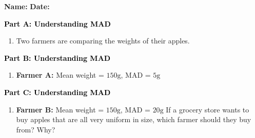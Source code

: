 \documentclass[12pt, letterpaper, fleqn]{article}
\begin{document}
\textbf{Name:} \underline{\hspace{5cm}}
\hfill
\textbf{Date:} \underline{\hspace{3cm}}\\

\begin{tcolorbox}[colback=customteal!20]
\large\textcolor{black}{\textbf{Part A: Understanding MAD}}
\end{tcolorbox}

\vspace{3mm}

\begin{enumerate}[itemsep=4.2cm, leftmargin=0.6cm]
\item Two farmers are comparing the weights of their apples. 
\end{enumerate}

\newpage

\begin{tcolorbox}[colback=customteal!20]
\large\textcolor{black}{\textbf{Part B: Understanding MAD}}
\end{tcolorbox}

\vspace{3mm}

\begin{enumerate}[itemsep=4.2cm, leftmargin=0.6cm, resume]
\item \textbf{Farmer A:} Mean weight = $150\text{g}$, MAD = $5\text{g}$
\end{enumerate}

\newpage

\begin{tcolorbox}[colback=customteal!20]
\large\textcolor{black}{\textbf{Part C: Understanding MAD}}
\end{tcolorbox}

\vspace{3mm}

\begin{enumerate}[itemsep=4.2cm, leftmargin=0.6cm, resume]
\item \textbf{Farmer B:} Mean weight = $150\text{g}$, MAD = $20\text{g}$
If a grocery store wants to buy apples that are all very uniform in size, which farmer should they buy from? Why?
\end{enumerate}

\newpage
\end{document}
